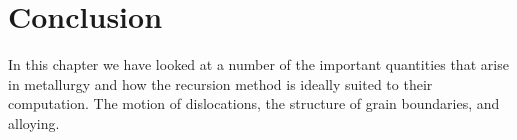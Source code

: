 \section{Conclusion}
In this chapter we have looked at a number of the important quantities that
arise in metallurgy and how the recursion method is ideally suited to their 
computation. The motion of dislocations, the structure of grain boundaries, 
and alloying. 


